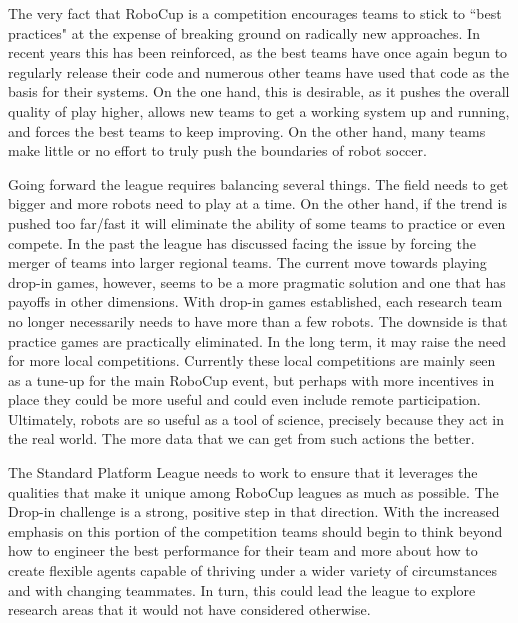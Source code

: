 \documentclass{llncs}
\begin{document}
The very fact that RoboCup is a competition
encourages teams to stick to ``best practices" at the expense of breaking ground on
radically new approaches. In recent years this has been reinforced, as the best teams
have once again begun to regularly release their code and numerous other teams have
used that code as the basis for their systems. On the one hand, this is desirable,
as it pushes the overall quality of play higher, allows new teams to get a working
system up and running, and forces the best teams to keep improving. On the other
hand, %
many teams make little or no effort to truly push the boundaries of robot
soccer. 

Going forward the league requires balancing several things. The field
needs to get bigger and more robots need to play at a time. On the other hand, if the
trend is pushed too far/fast it will eliminate the ability of some teams to practice or
even compete. In the past the league has discussed facing the issue by forcing the
merger of teams into larger regional teams. The current move towards playing drop-in
games, however, seems to be a more pragmatic solution and one that has payoffs
in other dimensions. With drop-in games established, each research team no longer necessarily needs to have more
than a few robots. The downside is that practice games are practically eliminated. In the long term, it may raise 
the need for more local competitions. Currently these local competitions
are mainly seen as a tune-up for the main RoboCup event, but perhaps with more incentives in place
they could be more useful and could even include remote participation. Ultimately,
robots are so useful as a tool of science, precisely because they act in the real world. The
more data that we can get from such actions the better.

The Standard Platform League 
needs to work to ensure that it leverages the qualities that make it unique among RoboCup leagues as much
as possible. The Drop-in challenge is a strong, positive step in that direction. With the
increased emphasis on this portion of the competition teams should begin to think beyond
how to engineer the best performance for their team and more about how to create flexible
agents capable of thriving under a wider variety of circumstances and with changing
teammates. In turn, this could lead the league to explore research areas that it would not have considered
otherwise. 
\end{document}
